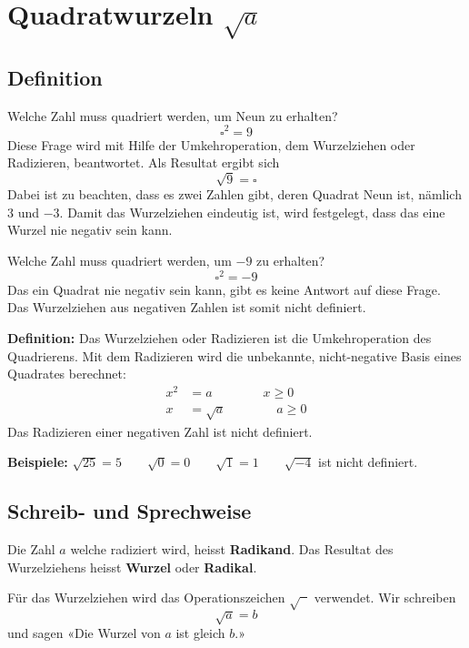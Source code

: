 \newpage
\section{Quadratwurzeln $\sqrt{a}$}

\subsection{Definition}

Welche Zahl muss quadriert werden, um Neun zu erhalten?
\[
  \square^{2} = 9
\]
Diese Frage wird mit Hilfe der Umkehroperation, dem Wurzelziehen oder Radizieren, beantwortet. Als Resultat ergibt sich
\[
  \sqrt{9} = \square
\]
Dabei ist zu beachten, dass es zwei Zahlen gibt, deren Quadrat Neun ist, nämlich $3$ und $-3$. Damit das Wurzelziehen eindeutig ist, wird festgelegt, dass das eine Wurzel nie negativ sein kann.

Welche Zahl muss quadriert werden, um $-9$ zu erhalten?
\[
  \square^{2}= -9
\]
Das ein Quadrat nie negativ sein kann, gibt es keine Antwort auf diese Frage. Das Wurzelziehen aus negativen Zahlen ist somit nicht definiert.


\textbf{Definition:} Das Wurzelziehen oder Radizieren ist die Umkehroperation des Quadrierens. Mit dem Radizieren wird die unbekannte, nicht-negative Basis eines Quadrates berechnet:
\begin{align*}
  x^{2} &= a \qquad\qquad x\ge 0\\
      x &= \sqrt{a} \qquad\qquad a\ge 0
\end{align*}
Das Radizieren einer negativen Zahl ist nicht definiert.

\begin{example}
  \textbf{Beispiele:} $\sqrt{25} = 5 \qquad \sqrt{0} = 0 \qquad \sqrt{1} = 1 \qquad \sqrt{-4}$ ist nicht definiert.
\end{example}


\subsection{Schreib- und Sprechweise}

Die Zahl $a$ welche radiziert wird, heisst \textbf{Radikand}. Das Resultat des Wurzelziehens heisst \textbf{Wurzel} oder \textbf{Radikal}.

Für das Wurzelziehen wird das Operationszeichen $\sqrt{\phantom{x}}$ verwendet. Wir schreiben
\[
  \sqrt{a} = b
\]
und sagen «Die Wurzel von $a$ ist gleich $b$.»

